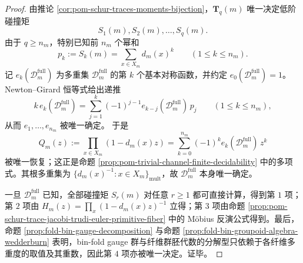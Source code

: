 \begin{proof}
由推论 \ref{cor:pom-schur-traces-moments-bijection}，\(\mathbf T_q(m)\) 唯一决定低阶碰撞矩
\[
S_1(m),S_2(m),\dots,S_q(m).
\]
由于 \(q\ge n_m\)，特别已知前 \(n_m\) 个幂和
\[
p_k:=S_k(m)=\sum_{x\in X_m}d_m(x)^k
\qquad(1\le k\le n_m).
\]
记 \(e_k(\mathcal D_m^{\mathrm{full}})\) 为多重集 \(\mathcal D_m^{\mathrm{full}}\) 的第 \(k\) 个基本对称函数，并约定 \(e_0(\mathcal D_m^{\mathrm{full}})=1\)。Newton--Girard 恒等式给出递推
\[
k\,e_k(\mathcal D_m^{\mathrm{full}})
=
\sum_{j=1}^{k}(-1)^{j-1}e_{k-j}(\mathcal D_m^{\mathrm{full}})\,p_j
\qquad(1\le k\le n_m),
\]
从而 \(e_1,\dots,e_{n_m}\) 被唯一确定。
于是
\[
Q_m(z):=\prod_{x\in X_m}(1-d_m(x)z)
=
\sum_{k=0}^{n_m}(-1)^k e_k(\mathcal D_m^{\mathrm{full}})\,z^k
\]
被唯一恢复；这正是命题 \ref{prop:pom-trivial-channel-finite-decidability} 中的多项式。其根多重集为
\(
\{d_m(x)^{-1}:x\in X_m\}_{\mathrm{mult}}
\)，故 \(\mathcal D_m^{\mathrm{full}}\) 本身唯一确定。

一旦 \(\mathcal D_m^{\mathrm{full}}\) 已知，全部碰撞矩 \(S_r(m)\) 对任意 \(r\ge 1\) 都可直接计算，得到第 \(1\) 项；第 \(2\) 项由 \(H_m(z)=\prod_x(1-d_m(x)z)^{-1}\) 立得；第 \(3\) 项由命题 \ref{prop:pom-schur-trace-jacobi-trudi-euler-primitive-fiber} 中的 Möbius 反演公式得到。最后，命题 \ref{prop:fold-bin-gauge-decomposition} 与命题 \ref{prop:fold-bin-groupoid-algebra-wedderburn} 表明，bin-fold gauge 群与纤维群胚代数的分解型只依赖于各纤维多重度的取值及其重数，因此第 \(4\) 项亦被唯一决定。证毕。
\end{proof}

